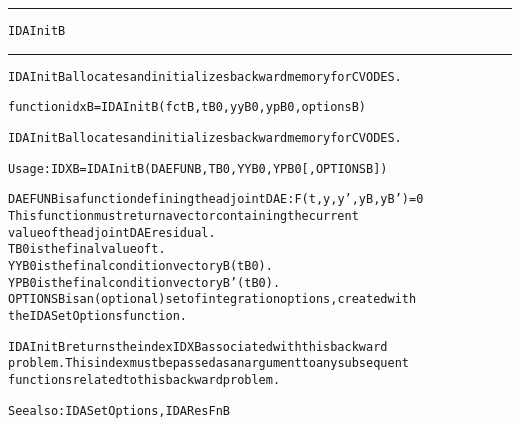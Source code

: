 \begin{samepage}
\hrule
\begin{center}
{\large \verb!IDAInitB!}
\label{p:IDAInitB}
\end{center}
\hrule\vspace{0.1in}



\begin{alltt}
IDAInitB allocates and initializes backward memory for CVODES.
\end{alltt}

\end{samepage}



\begin{samepage}


\begin{alltt}
function idxB = IDAInitB(fctB, tB0, yyB0, ypB0, optionsB) 
\end{alltt}

\end{samepage}



\begin{alltt}
IDAInitB allocates and initializes backward memory for CVODES.

   Usage:   IDXB = IDAInitB ( DAEFUNB, TB0, YYB0, YPB0 [, OPTIONSB] )

   DAEFUNB  is a function defining the adjoint DAE: F(t,y,y',yB,yB')=0
            This function must return a vector containing the current 
            value of the adjoint DAE residual.
   TB0      is the final value of t.
   YYB0     is the final condition vector yB(tB0).  
   YPB0     is the final condition vector yB'(tB0).  
   OPTIONSB is an (optional) set of integration options, created with
            the IDASetOptions function. 

   IDAInitB returns the index IDXB associated with this backward
   problem. This index must be passed as an argument to any subsequent
   functions related to this backward problem.

   See also: IDASetOptions, IDAResFnB
\end{alltt}






\vspace{0.1in}